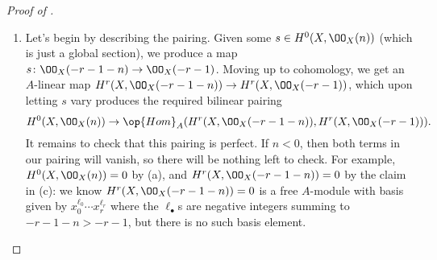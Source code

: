 \documentclass[../notes.tex]{subfiles}
\begin{document}
\begin{proof}[Proof of ]
\begin{enumerate}[label=(\alph*)]
		So it remains to show the claim. Well, looking at our \v Cech complex,
		\[\check H^r(\mc U,\mc F)=\coker\Bigg(\prod_jS_{x_0\cdots\widehat x_j\cdots x_r}\stackrel{d^{r-1}}\to S_{x_0\cdots x_r}\Bigg).\]
		Now, $S_{x_0\cdots x_r}$ is a free $A$-module with basis given by terms of the form $x_0^{\ell_0}\cdots x_r^{\ell_r}$ where $\ell_0,\ldots,\ell_r\in\ZZ$, so we want the cokernel to kill all undesired terms. Well, tracking through $d^{r-1}$, we find that it is just inclusion (up to sign), so the image is the free $A$-module with basis given by terms of the form $x_0^{\ell_0}\cdots x_r^{\ell_r}$ with at least one nonnegative exponent, so the claim follows.

		\item Let's begin by describing the pairing. Given some $s\in H^0(X,\OO_X(n))$ (which is just a global section), we produce a map $s\colon\OO_X(-r-1-n)\to\OO_X(-r-1)$. Moving up to cohomology, we get an $A$-linear map $H^r(X,\OO_X(-r-1-n))\to H^r(X,\OO_X(-r-1))$, which upon letting $s$ vary produces the required bilinear pairing
		\[H^0(X,\OO_X(n))\to\op{Hom}_A(H^r(X,\OO_X(-r-1-n)),H^r(X,\OO_X(-r-1))).\]
		It remains to check that this pairing is perfect. If $n<0$, then both terms in our pairing will vanish, so there will be nothing left to check. For example, $H^0(X,\OO_X(n))=0$ by (a), and $H^r(X,\OO_X(-r-1-n))=0$ by the claim in (c): we know $H^r(X,\OO_X(-r-1-n))=0$ is a free $A$-module with basis given by $x_0^{\ell_0}\cdots x_r^{\ell_r}$ where the $\ell_\bullet$s are negative integers summing to $-r-1-n>-r-1$, but there is no such basis element.


\end{enumerate}
\end{proof}
\end{document}
